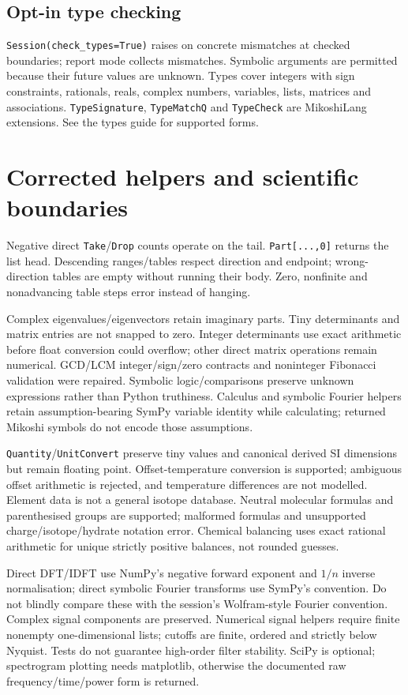 \documentclass[11pt,a4paper]{article}
\begin{document}
\subsection{Opt-in type checking}
\texttt{Session(check\_types=True)} raises on concrete mismatches at checked boundaries; report mode collects mismatches. Symbolic arguments are permitted because their future values are unknown. Types cover integers with sign constraints, rationals, reals, complex numbers, variables, lists, matrices and associations. \texttt{TypeSignature}, \texttt{TypeMatchQ} and \texttt{TypeCheck} are MikoshiLang extensions. See the types guide for supported forms.

\section{Corrected helpers and scientific boundaries}
Negative direct \texttt{Take}/\texttt{Drop} counts operate on the tail. \texttt{Part[...,0]} returns the list head. Descending ranges/tables respect direction and endpoint; wrong-direction tables are empty without running their body. Zero, nonfinite and nonadvancing table steps error instead of hanging.

Complex eigenvalues/eigenvectors retain imaginary parts. Tiny determinants and matrix entries are not snapped to zero. Integer determinants use exact arithmetic before float conversion could overflow; other direct matrix operations remain numerical. GCD/LCM integer/sign/zero contracts and noninteger Fibonacci validation were repaired. Symbolic logic/comparisons preserve unknown expressions rather than Python truthiness. Calculus and symbolic Fourier helpers retain assumption-bearing SymPy variable identity while calculating; returned Mikoshi symbols do not encode those assumptions.

\texttt{Quantity}/\texttt{UnitConvert} preserve tiny values and canonical derived SI dimensions but remain floating point. Offset-temperature conversion is supported; ambiguous offset arithmetic is rejected, and temperature differences are not modelled. Element data is not a general isotope database. Neutral molecular formulas and parenthesised groups are supported; malformed formulas and unsupported charge/isotope/hydrate notation error. Chemical balancing uses exact rational arithmetic for unique strictly positive balances, not rounded guesses.

Direct DFT/IDFT use NumPy's negative forward exponent and $1/n$ inverse normalisation; direct symbolic Fourier transforms use SymPy's convention. Do not blindly compare these with the session's Wolfram-style Fourier convention. Complex signal components are preserved. Numerical signal helpers require finite nonempty one-dimensional lists; cutoffs are finite, ordered and strictly below Nyquist. Tests do not guarantee high-order filter stability. SciPy is optional; spectrogram plotting needs matplotlib, otherwise the documented raw frequency/time/power form is returned.
\end{document}
